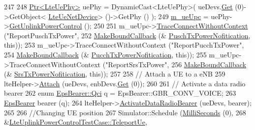 \begin{DoxyCode}
247 
248   \hyperlink{classns3_1_1Ptr}{Ptr<LteUePhy>} uePhy = DynamicCast<LteUePhy>( ueDevs.\hyperlink{classns3_1_1NetDeviceContainer_a677d62594b5c9d2dea155cc5045f4d0b}{Get} (0)->GetObject<
      \hyperlink{classns3_1_1LteUeNetDevice}{LteUeNetDevice}> ()->GetPhy () );
249   \hyperlink{classLteUplinkPowerControlTestCase_af2fabece7259e4b60cc73d7ec02b7a3d}{m\_ueUpc} = uePhy->\hyperlink{classns3_1_1LteUePhy_a386b038c79252c3fe8408e68279fa88b}{GetUplinkPowerControl} ();
250 
251   m\_ueUpc->\hyperlink{classns3_1_1ObjectBase_a1be45f6fd561e75dcac9dfa81b2b81e4}{TraceConnectWithoutContext} (\textcolor{stringliteral}{"ReportPuschTxPower"},
252                                        \hyperlink{group__makeboundcallback_ga1725d6362e6065faa0709f7c93f8d770}{MakeBoundCallback} (&
      \hyperlink{lte-test-uplink-power-control_8cc_a2236a3f87ff177b3305bf82ff492f8ad}{PuschTxPowerNofitication}, \textcolor{keyword}{this}));
253   m\_ueUpc->TraceConnectWithoutContext (\textcolor{stringliteral}{"ReportPucchTxPower"},
254                                        \hyperlink{group__makeboundcallback_ga1725d6362e6065faa0709f7c93f8d770}{MakeBoundCallback} (&
      \hyperlink{lte-test-uplink-power-control_8cc_a4a348fa3ab0a4e65de2ddb70fe0176e3}{PucchTxPowerNofitication}, \textcolor{keyword}{this}));
255   m\_ueUpc->TraceConnectWithoutContext (\textcolor{stringliteral}{"ReportSrsTxPower"},
256                                        \hyperlink{group__makeboundcallback_ga1725d6362e6065faa0709f7c93f8d770}{MakeBoundCallback} (&
      \hyperlink{lte-test-uplink-power-control_8cc_acc0b838be35884288e3872794ca2903d}{SrsTxPowerNofitication}, \textcolor{keyword}{this}));
257 
258   \textcolor{comment}{// Attach a UE to a eNB}
259   lteHelper->\hyperlink{classns3_1_1LteHelper_a9466743f826aa2652a87907b7f0a1c87}{Attach} (ueDevs, enbDevs.\hyperlink{classns3_1_1NetDeviceContainer_a677d62594b5c9d2dea155cc5045f4d0b}{Get} (0));
260 
261   \textcolor{comment}{// Activate a data radio bearer}
262   \textcolor{keyword}{enum} \hyperlink{structns3_1_1EpsBearer_aecf0c67109c5eb4ec0b07226fff5885e}{EpsBearer::Qci} q = EpsBearer::GBR\_CONV\_VOICE;
263   \hyperlink{structns3_1_1EpsBearer}{EpsBearer} bearer (q);
264   lteHelper->\hyperlink{classns3_1_1LteHelper_ac896e16cf162e4beeaa292d39ab1b700}{ActivateDataRadioBearer} (ueDevs, bearer);
265 
266   \textcolor{comment}{//Changing UE position}
267   Simulator::Schedule (\hyperlink{group__timecivil_gaf26127cf4571146b83a92ee18679c7a9}{MilliSeconds} (0),
268                        &\hyperlink{classLteUplinkPowerControlTestCase_a97a59d65135bb418dd2aaabd673c5da0}{LteUplinkPowerControlTestCase::TeleportUe},

\end{DoxyCode}
